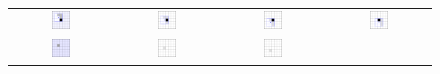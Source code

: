 \begin{primer}
\begin{figure}[htbp]
  \centering%
  \begin{tabular}{cccc}
  \includegraphics[width=0.2\textwidth]{./slike-latex/filter1}&
  \includegraphics[width=0.2\textwidth]{./slike-latex/filter2}&
  \includegraphics[width=0.2\textwidth]{./slike-latex/filter3}&
  \includegraphics[width=0.2\textwidth]{./slike-latex/filter4}\\[0.4cm]
  \includegraphics[width=0.2\textwidth]{./slike-latex/filter1s}&
  \includegraphics[width=0.2\textwidth]{./slike-latex/filter2s}&
  \includegraphics[width=0.2\textwidth]{./slike-latex/filter3s}&

\end{tabular}
\end{figure}
\end{primer}
